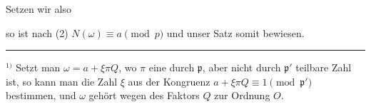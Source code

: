 Setzen wir also


so ist nach (2) $N(\omega) \equiv a \pmod{p}$ und unser Satz somit bewiesen.

\par\noindent\rule{0.25\linewidth}{0.4pt}\par
\begingroup\footnotesize
$^{1)}$ Setzt man $\omega = a + \xi \pi Q$, wo $\pi$ eine durch $\mathfrak{p}$, aber nicht durch $\mathfrak{p}'$ teilbare Zahl ist, so kann man die Zahl $\xi$ aus der Kongruenz $a + \xi \pi Q \equiv 1 \pmod{\mathfrak{p}'}$ bestimmen, und $\omega$ gehört wegen des Faktors $Q$ zur Ordnung $O$.
\endgroup
